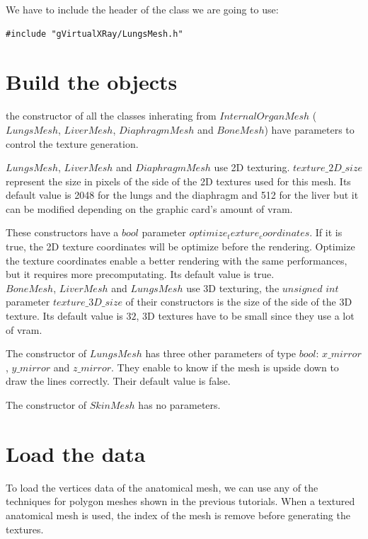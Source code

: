 \documentclass[12pt]{report}
\begin{document}
We have to include the header of the class we are going to use:
\begin{lstlisting}
#include "gVirtualXRay/LungsMesh.h"
\end{lstlisting}

\chapter{Build the objects}

	the constructor of all the classes inherating from $InternalOrganMesh$ ($LungsMesh$, $LiverMesh$, $DiaphragmMesh$ and $BoneMesh$) have parameters to control the texture generation. 
	
	$LungsMesh$, $LiverMesh$ and $DiaphragmMesh$ use 2D texturing. $texture\_2D\_size$ represent the size in pixels of the side of the 2D textures used for this mesh. Its default value is 2048 for the lungs and the diaphragm and 512 for the liver but it can be modified depending on the graphic card's amount of vram.
	
	These constructors have a $bool$ parameter $optimize_texture_coordinates$. If it is true, the 2D texture coordinates will be optimize before the rendering. Optimize the texture coordinates enable a better rendering with the same performances, but it requires more precomputating. Its default value is true. \\
	
	$BoneMesh$, $LiverMesh$ and $LungsMesh$ use 3D texturing, the $unsigned$ $int$ parameter $texture\_3D\_size$ of their constructors is the size of the side of the 3D texture. Its default value is $32$, 3D textures have to be small since they use a lot of vram.
		
	The constructor of $LungsMesh$ has three other parameters of type $bool$: $x\_mirror$, $y\_mirror$ and $z\_mirror$. They enable to know if the mesh is upside down to draw the lines correctly. Their default value is false.

	The constructor of $SkinMesh$ has no parameters.

\chapter{Load the data}

To load the vertices data of the anatomical mesh, we can use any of the techniques for polygon meshes shown in the previous tutorials. When a textured anatomical mesh is used, the index of the mesh is remove before generating the textures.
\end{document}
